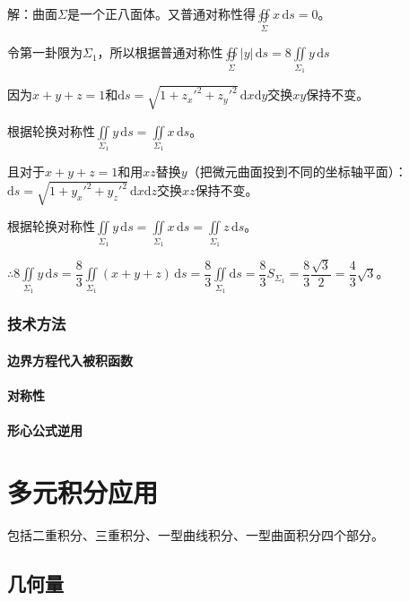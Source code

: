 \documentclass[UTF8, 12pt]{ctexart}
\begin{document}
解：曲面$\Sigma$是一个正八面体。又普通对称性得$\oiint\limits_\Sigma x\,\textrm{d}s=0$。

令第一卦限为$\Sigma_1$，所以根据普通对称性$\oiint\limits_\Sigma\vert y\vert\,\textrm{d}s=8\iint\limits_{\Sigma_1}y\,\textrm{d}s$

因为$x+y+z=1$和$\textrm{d}s=\sqrt{1+z_x'^2+z_y'^2}\,\textrm{d}x\textrm{d}y$交换$xy$保持不变。

根据轮换对称性$\iint\limits_{\Sigma_1}y\,\textrm{d}s=\iint\limits_{\Sigma_1}x\,\textrm{d}s$。

且对于$x+y+z=1$和用$xz$替换$y$（把微元曲面投到不同的坐标轴平面）：$\textrm{d}s=\sqrt{1+y_x'^2+y_z'^2}\,\textrm{d}x\textrm{d}z$交换$xz$保持不变。

根据轮换对称性$\iint\limits_{\Sigma_1}y\,\textrm{d}s=\iint\limits_{\Sigma_1}x\,\textrm{d}s=\iint\limits_{\Sigma_1}z\,\textrm{d}s$。

$\therefore8\iint\limits_{\Sigma_1}y\,\textrm{d}s=\dfrac{8}{3}\iint\limits_{\Sigma_1}(x+y+z)\,\textrm{d}s=\dfrac{8}{3}\iint\limits_{\Sigma_1}\textrm{d}s=\dfrac{8}{3}S_{\Sigma_1}=\dfrac{8}{3}\dfrac{\sqrt{3}}{2}=\dfrac{4}{3}\sqrt{3}$。

\subsubsection{技术方法}

\paragraph{边界方程代入被积函数} \leavevmode \medskip

\paragraph{对称性} \leavevmode \medskip

\paragraph{形心公式逆用} \leavevmode \medskip

\section{多元积分应用}

包括二重积分、三重积分、一型曲线积分、一型曲面积分四个部分。

\subsection{几何量}
\end{document}
